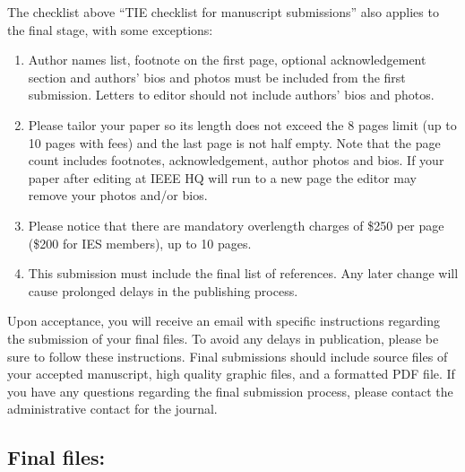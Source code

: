 \documentclass[journal]{IEEEtranTICPS}
\begin{document}
The checklist above ``TIE checklist for manuscript submissions'' also applies to the final stage, with some exceptions:

\begin{enumerate}[1)]
	\item Author names list, footnote on the first page, optional acknowledgement section and authors' bios and photos must be included from the first submission. Letters to editor should not include authors' bios and photos.
	\item Please tailor your paper so its length does not exceed the 8 pages limit (up to 10 pages with fees) and the last page is not half empty. Note that the page count includes footnotes, acknowledgement, author photos and bios. If your paper after editing at IEEE HQ will run to a new page the editor may remove your photos and/or bios.
	\item Please notice that there are mandatory overlength charges of \$250 per page (\$200 for IES members), up to 10 pages.
	\item This submission must include the final list of references. Any later change will cause prolonged delays in the publishing process.
\end{enumerate}
	
Upon acceptance, you will receive an email with specific instructions regarding the submission of your final files.  To avoid any delays in publication, please be sure to follow these instructions. Final submissions should include source files of your accepted manuscript, high quality graphic files, and a formatted PDF file. If you have any questions regarding the final submission process, please contact the administrative contact for the journal.

\subsection{Final files:}
\end{document}
